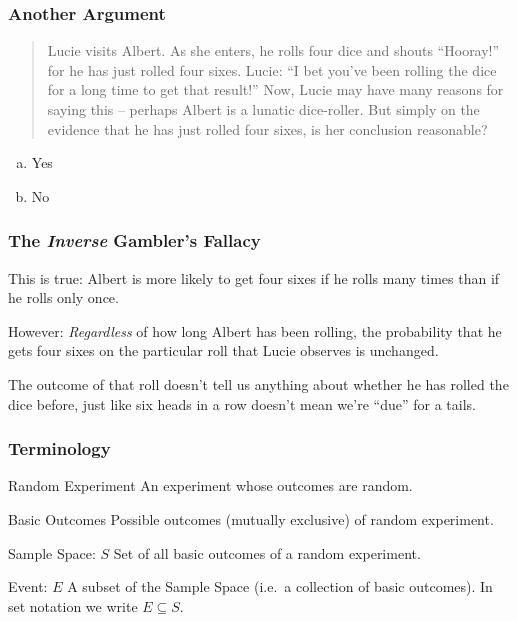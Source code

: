 \documentclass[handout]{beamer}
\begin{document}
\begin{frame}
\frametitle{Another Argument}
\begin{quote}
Lucie visits Albert. As she enters, he rolls four dice and shouts ``Hooray!'' for he has just rolled four sixes. Lucie: ``I bet you've been rolling the dice for a long time to get that result!'' Now, Lucie may have many reasons for saying this -- perhaps Albert is a lunatic dice-roller. But simply on the evidence that he has just rolled four sixes, is her conclusion reasonable?
\end{quote}

\begin{enumerate}[(a)]
	\item Yes
	\item No
\end{enumerate}

\end{frame}
\begin{frame}
\frametitle{The \emph{Inverse} Gambler's Fallacy}

\begin{block}{This is true:}
Albert is more likely to get four sixes if he rolls many times than if he rolls only once.\end{block}
\begin{block}{However:} \emph{Regardless} of how long Albert has been rolling, the probability that he gets four sixes \alert{on the particular roll that Lucie observes} is unchanged. \end{block}
\vspace{2em}
\begin{block}{The outcome of that roll doesn't tell us anything about whether he has rolled the dice before, just like six heads in a row doesn't mean we're ``due'' for a tails.}\end{block}

\end{frame}
\begin{frame}
\frametitle{Terminology}
\begin{block}{Random Experiment}
An experiment whose outcomes are random.
\end{block}
\begin{block}{Basic Outcomes}
Possible outcomes (mutually exclusive) of random experiment.
\end{block}
\begin{block}{Sample Space: $S$}
Set of all basic outcomes of a random experiment.
\end{block}

\begin{block}{Event: $E$}
A subset of the Sample Space (i.e.\ a collection of basic outcomes). In set notation we write $E \subseteq S$.
\end{block}

\end{frame}
\end{document}
